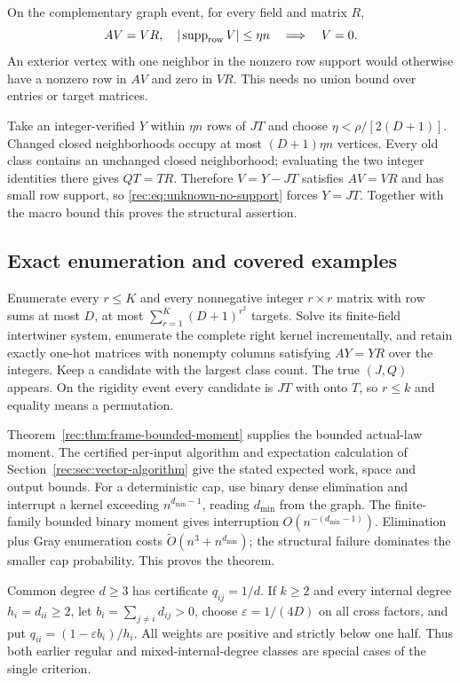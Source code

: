 \documentclass[11pt]{article}
\theoremstyle{definition}
\theoremstyle{remark}
\newcommand{\1}{\mathbf 1}
\providecommand{\supp}{\operatorname{supp}}
\begin{document}
On the complementary graph event, for every field and matrix $R$,
\begin{equation}\label{rec:eq:unknown-no-support}
 AV=VR,\quad |\supp_{\rm row}V|\le\eta n\quad\Longrightarrow\quad V=0.
\end{equation}
An exterior vertex with one neighbor in the nonzero row support
would otherwise have a nonzero row in $AV$ and zero in $VR$.
This needs no union bound over entries or target matrices.

Take an integer-verified $Y$ within $\eta n$ rows of $JT$ and choose
$\eta<\rho/[2(D+1)]$. Changed closed neighborhoods occupy at most
$(D+1)\eta n$ vertices. Every old class contains an unchanged closed
neighborhood; evaluating the two integer identities there gives
$QT=TR$. Therefore $V=Y-JT$ satisfies $AV=VR$ and has small row
support, so \eqref{rec:eq:unknown-no-support} forces $Y=JT$.
Together with the macro bound this proves the structural assertion.

\subsection{Exact enumeration and covered examples}
Enumerate every $r\le K$ and every nonnegative integer $r\times r$
matrix with row sums at most $D$, at most
$\sum_{r=1}^K(D+1)^{r^2}$ targets. Solve its finite-field intertwiner
system, enumerate the complete right kernel incrementally, and retain
exactly one-hot matrices with nonempty columns satisfying $AY=YR$
over the integers. Keep a candidate with the largest class count.
The true $(J,Q)$ appears. On the rigidity event every candidate is
$JT$ with onto $T$, so $r\le k$ and equality means a permutation.

Theorem~\ref{rec:thm:frame-bounded-moment} supplies the bounded actual-law
moment. The certified per-input algorithm and expectation calculation
of Section~\ref{rec:sec:vector-algorithm} give the stated expected work,
space and output bounds. For a deterministic cap, use binary dense
elimination and interrupt a kernel exceeding $n^{d_{\min}-1}$,
reading $d_{\min}$ from the graph. The finite-family bounded binary
moment gives interruption $O(n^{-(d_{\min}-1)})$.
Elimination plus Gray enumeration costs
$\widetilde O(n^3+n^{d_{\min}})$; the structural failure dominates
the smaller cap probability. This proves the theorem.

Common degree $d\ge3$ has certificate $q_{ij}=1/d$.
If $k\ge2$ and every internal degree $h_i=d_{ii}\ge2$, let
$b_i=\sum_{j\ne i}d_{ij}>0$, choose $\varepsilon=1/(4D)$ on all
cross factors, and put $q_{ii}=(1-\varepsilon b_i)/h_i$.
All weights are positive and strictly below one half.
Thus both earlier regular and mixed-internal-degree classes are
special cases of the single criterion.
\end{document}
